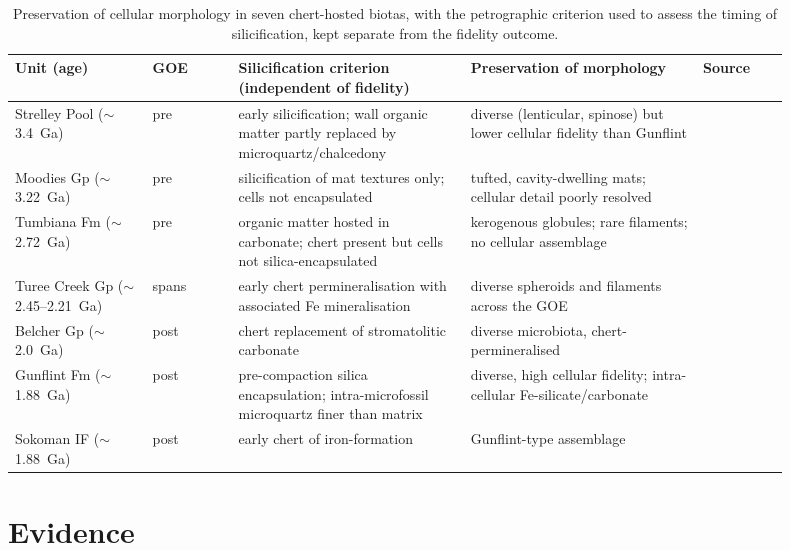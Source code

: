 \documentclass[11pt]{article}
\begin{document}
\begin{table}[t]
\centering\small
\caption{Preservation of cellular morphology in seven chert-hosted biotas, with the petrographic
criterion used to assess the timing of silicification, kept separate from the fidelity outcome.}
\label{tab:panel}
\begin{tabular}{p{0.16\linewidth}p{0.10\linewidth}p{0.27\linewidth}p{0.27\linewidth}p{0.10\linewidth}}
\toprule
Unit (age) & GOE & Silicification criterion (independent of fidelity) & Preservation of morphology & Source \\
\midrule
Strelley Pool ($\sim$3.4~Ga) & pre & early silicification; wall organic matter partly replaced by microquartz/chalcedony & diverse (lenticular, spinose) but lower cellular fidelity than Gunflint & \citep{Sugitani2010,Delarue2020,Wacey2012} \\
Moodies Gp ($\sim$3.22~Ga) & pre & silicification of mat textures only; cells not encapsulated & tufted, cavity-dwelling mats; cellular detail poorly resolved & \citep{Homann2015} \\
Tumbiana Fm ($\sim$2.72~Ga) & pre & organic matter hosted in carbonate; chert present but cells not silica-encapsulated & kerogenous globules; rare filaments; no cellular assemblage & \citep{Lepot2009,Decraene2021} \\
Turee Creek Gp ($\sim$2.45--2.21~Ga) & spans & early chert permineralisation with associated Fe mineralisation & diverse spheroids and filaments across the GOE & \citep{Lepot2017TC,Barlow2018} \\
\midrule
Belcher Gp ($\sim$2.0~Ga) & post & chert replacement of stromatolitic carbonate & diverse microbiota, chert-permineralised & \citep{Javaux2018} \\
Gunflint Fm ($\sim$1.88~Ga) & post & pre-compaction silica encapsulation; intra-microfossil microquartz finer than matrix & diverse, high cellular fidelity; intra-cellular Fe-silicate/carbonate & \citep{Lepot2017,Wacey2013,Alleon2016} \\
Sokoman IF ($\sim$1.88~Ga) & post & early chert of iron-formation & Gunflint-type assemblage & \citep{Javaux2018} \\
\bottomrule
\end{tabular}
\end{table}

\section{Evidence}
\end{document}
